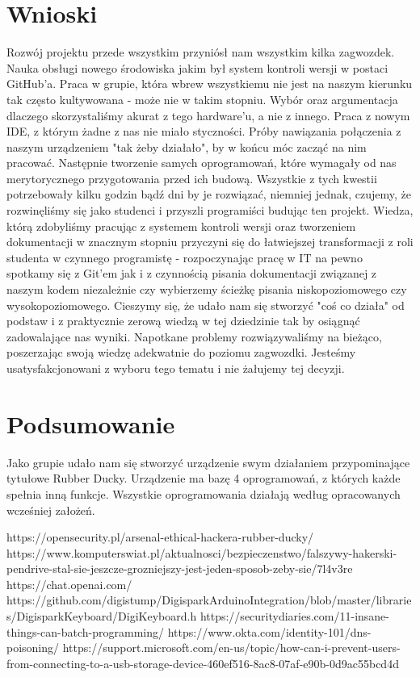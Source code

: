\documentclass{article}
\begin{document}
\section{Wnioski}
    Rozwój projektu przede wszystkim przyniósł nam wszystkim kilka zagwozdek. Nauka obsługi nowego środowiska jakim był system kontroli wersji w postaci GitHub'a. Praca w grupie, która wbrew wszystkiemu nie jest na naszym kierunku tak często kultywowana - może nie w takim stopniu. Wybór oraz argumentacja dlaczego skorzystaliśmy akurat z tego hardware'u, a nie z innego. Praca z nowym IDE, z którym żadne z nas nie miało styczności. Próby nawiązania połączenia z naszym urządzeniem "tak żeby działało", by w końcu móc zacząć na nim pracować. Następnie tworzenie samych oprogramowań, które wymagały od nas merytorycznego przygotowania przed ich budową. Wszystkie z tych kwestii potrzebowały kilku godzin bądź dni by je rozwiązać, niemniej jednak, czujemy, że rozwinęliśmy się jako studenci i przyszli programiści budując ten projekt. Wiedza, którą zdobyliśmy pracując z systemem kontroli wersji oraz tworzeniem dokumentacji w znacznym stopniu przyczyni się do łatwiejszej transformacji z roli studenta w czynnego programistę - rozpoczynając pracę w IT na pewno spotkamy się z Git'em jak i z czynnością pisania dokumentacji związanej z naszym kodem niezależnie czy wybierzemy ścieżkę pisania niskopoziomowego czy wysokopoziomowego. Cieszymy się, że udało nam się stworzyć "coś co działa" od podstaw i z praktycznie zerową wiedzą w tej dziedzinie tak by osiągnąć zadowalające nas wyniki. Napotkane problemy rozwiązywaliśmy na bieżąco, poszerzając swoją wiedzę adekwatnie do poziomu zagwozdki. Jesteśmy usatysfakcjonowani z wyboru tego tematu i nie żałujemy tej decyzji.

\section{Podsumowanie}
      Jako grupie udało nam się stworzyć urządzenie swym działaniem przypominające tytułowe Rubber Ducky. Urządzenie ma bazę 4 oprogramowań, z których każde spełnia inną funkcje. Wszystkie oprogramowania działają według opracowanych wcześniej założeń.
\newpage
\begin{thebibliography}{9}

\bibitem{}
  https://opensecurity.pl/arsenal-ethical-hackera-rubber-ducky/
 \bibitem{} https://www.komputerswiat.pl/aktualnosci/bezpieczenstwo/falszywy-hakerski-pendrive-stal-sie-jeszcze-grozniejszy-jest-jeden-sposob-zeby-sie/7l4v3re
 \bibitem{} https://chat.openai.com/
 \bibitem{} https://github.com/digistump/DigisparkArduinoIntegration/blob/master/libraries/DigisparkKeyboard/DigiKeyboard.h
 \bibitem{} https://securitydiaries.com/11-insane-things-can-batch-programming/
 \bibitem{} https://www.okta.com/identity-101/dns-poisoning/
 \bibitem{} https://support.microsoft.com/en-us/topic/how-can-i-prevent-users-from-connecting-to-a-usb-storage-device-460ef516-8ac8-07af-e90b-0d9ac55bcd4d
\end{thebibliography}
\end{document}

